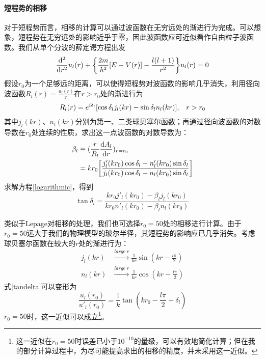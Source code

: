 \documentclass[cs4size,titlepage,twoside]{ctexart}
\begin{document}
\paragraph{短程势的相移}
对于短程势而言，相移的计算可以通过波函数在无穷远处的渐进行为完成。可以想象，短程势在无穷远处的影响近乎于零，因此波函数应可近似看作自由粒子波函数。我们从单个分波的薛定谔方程\cite{Griffiths}出发
\begin{equation}\label{Schrodinger}
	\dv[2]{r}u_l(r)+\Bqty{\frac{2m}{\hbar^2}\bqty{E-V(r)}-\frac{l(l+1)}{r^2}}u_l(r)=0
\end{equation}
假设$r_0$为一个足够远的距离，可以使得短程势对波函数的影响几乎消失，利用径向波函数$R_l(r)=\displaystyle\frac{u_l(r)}{r}$在$r>r_0$处的渐进行为\cite{sakurai}
\begin{eqnarray}
	R_l(r)=e^{i\delta_l}\bqty{\cos\delta_lj_l(kr)-\sin\delta_ln_l(kr)}\text{,\quad}r>r_0
\end{eqnarray}
其中$j_l(kr)$、$n_l(kr)$分别为第一、二类球贝塞尔函数；再通过径向波函数的对数导数在$r_0$处连续的性质，求出这一点波函数的对数导数为：
\begin{align}
	\nonumber\beta_l & \equiv (\frac{r}{R_l}\dv{A_l}{r})_{r=r_0}                                                                                         \\
	                 & = kr_0\bqty{\frac{j'_l(kr_0)\cos\delta_l-n'_l(kr_0)\sin\delta_l}{j_l(kr_0)\cos\delta_l-n_l(kr_0)\sin\delta_l}}\label{logarithmic}
\end{align}
求解方程\eqref{logarithmic}，得到%
\begin{equation}\label{tandelta}
	\tan\delta_l=\frac{kr_0j'_l(kr_0)-\beta_lj_l(kr_0)}{kr_0n'_l(kr_0)-\beta_ln_l(kr_0)}
\end{equation}

类似于Lepage对相移的处理\cite{Lepage}，我们也可选择$r_0=50$处的相移进行计算。由于$r_0=50$远大于我们的物理模型的玻尔半径，其短程势的影响应已几乎消失。考虑球贝塞尔函数在较大的$r$处的渐进行为\cite{Jinyan}：
\begin{align}
	\nonumber j_l(kr) & \xrightarrow{large\;r}\frac{1}{kr}\sin(kr-\frac{l\pi}{2}) \\
	\nonumber n_l(kr) & \xrightarrow{large\;r}\frac{1}{kr}\cos(kr-\frac{l\pi}{2})
\end{align}
式\eqref{tandelta}可以变形为
\begin{equation}\label{phaseshift}
	\frac{u_l(r_0)}{u'_l(r_0)} = \frac{1}{k}\tan(kr_0-\frac{l\pi}{2}+\delta_l)
\end{equation}
$r_0=50$时，这一近似可以成立\footnote{这一近似在$r_0=50$时误差已小于$10^{-10}$的量级，可以有效地简化计算；但在我的部分计算过程中，为尽可能提高求出的相移的精度，并未采用这一近似。}。
\end{document}
